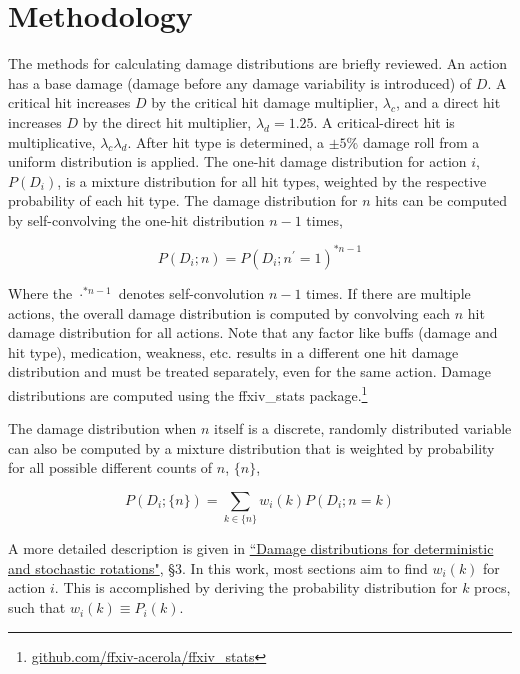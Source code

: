 \section{Methodology}

The methods for calculating damage distributions are briefly reviewed. An action has a base damage (damage before any damage variability is introduced) of $D$. A critical hit increases $D$ by the critical hit damage multiplier, $\lambda_c$, and a direct hit increases $D$ by the direct hit multiplier, $\lambda_d = 1.25$. A critical-direct hit is multiplicative, $\lambda_c \lambda_d$. After hit type is determined, a $\pm 5\%$ damage roll from a uniform distribution is applied. The one-hit damage distribution for action $i$, $P(D_i)$, is a mixture distribution for all hit types, weighted by the respective probability of each hit type. The damage distribution for $n$ hits can be computed by self-convolving the one-hit distribution $n-1$ times,

\begin{equation}
    P(D_i; n) = P(D_i; n^\prime = 1)^{\ast n-1}
\end{equation}

Where the $\cdot^{\ast n-1}$ denotes self-convolution $n-1$ times. If there are multiple actions, the overall damage distribution is computed by convolving each $n$ hit damage distribution for all actions. Note that any factor like buffs (damage and hit type), medication, weakness, etc. results in a different one hit damage distribution and must be treated separately, even for the same action. Damage distributions are computed using the ffxiv\_stats package.\footnote{\href{https://github.com/ffxiv-acerola/ffxiv_stats}{github.com/ffxiv-acerola/ffxiv\_stats}}

The damage distribution when $n$ itself is a discrete, randomly distributed variable can also be computed by a mixture distribution that is weighted by probability for all possible different counts of $n$, $\{n\}$,

\begin{equation}
    P(D_i; \{n\}) = \sum_{k \in \{n\}} w_i(k) P(D_i; n = k)
    \label{eqn:dmg-mixture}
\end{equation}

A more detailed description is given in \href{https://github.com/ffxiv-acerola/damage_variability_papers/blob/main/02_damage_distributions_deterministic_stochastic/Damage%20distributions%20for%20deterministic%20and%20stochastic%20rotations.pdf}{``Damage distributions for deterministic and stochastic rotations"}, §3. In this work, most sections aim to find $w_i(k)$ for action $i$. This is accomplished by deriving the probability distribution for $k$ procs, such that $w_i(k) \equiv P_i(k)$.

